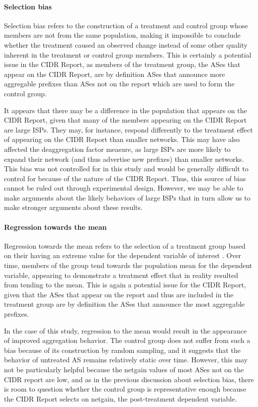 \paragraph{Selection bias}
Selection bias refers to the construction of a treatment and control group
whose members are not from the same population, making it impossible to
conclude whether the treatment caused an observed change instead of some other
quality inherent in the treatment or control group members. This is certainly
a potential issue in the CIDR Report, as members of the treatment group, the
ASes that appear on the CIDR Report, are by definition ASes that announce more
aggregable prefixes than ASes not on the report which are used to form the
control group.

It appears that there may be a difference in the population that appears on the
CIDR Report, given that many of the members appearing on the CIDR Report are
large ISPs. They may, for instance, respond differently to the treatment effect
of appearing on the CIDR Report than smaller networks. This may have also
affected the deaggregation factor measure, as large ISPs are more likely to
expand their network (and thus advertise new prefixes) than smaller networks.
This bias was not controlled for in this study and would be generally difficult
to control for because of the nature of the CIDR Report. Thus, this source of
bias cannot be ruled out through experimental design. However, we may be able
to make arguments about the likely behaviors of large ISPs that in turn allow
us to make stronger arguments about these results.


\paragraph{Regression towards the mean}
Regression towards the mean refers to the selection of a treatment group based
on their having an extreme value for the dependent variable of interest
\cite{Babbie:2003uq}. Over time, members of the group tend towards the
population mean for the dependent variable, appearing to demonstrate a
treatment effect that in reality resulted from tending to the mean. This is
again a potential issue for the CIDR Report, given that the ASes that appear on
the report and thus are included in the treatment group are by definition the
ASes that announce the most aggregable prefixes.

In the case of this study, regression to the mean would result in the
appearance of improved aggregation behavior. The control group does not suffer
from such a bias because of its construction by random sampling, and it
suggests that the behavior of untreated AS remains relatively static over time.
However, this may not be particularly helpful because the netgain values of
most ASes not on the CIDR report are low, and as in the previous discussion
about selection bias, there is room to question whether the control group is
representative enough because the CIDR Report selects on netgain, the
post-treatment dependent variable.

